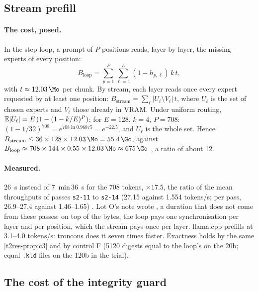 \subsection{Stream prefill}\label{t2res-sec:flux}

\paragraph{The cost, posed.} In the step loop, a prompt of $P$ positions reads, layer by layer, the missing experts of every position:
\[
B_{\text{loop}} = \sum_{p=1}^{P}\sum_{\ell=1}^{L} (1 - h_{p,\ell}) \, k \, t,
\]
with $t \approx \SI{12.03}{\Mo}$ per chunk. By stream, each layer reads once every expert requested by at least one position: $B_{\text{stream}} = \sum_\ell |U_\ell \setminus V_\ell| \, t$, where $U_\ell$ is the set of chosen experts and $V_\ell$ those already in VRAM. Under uniform routing, $\mathbb{E}|U_\ell| = E\,(1 - (1 - k/E)^P)$; for $E = 128$, $k = 4$, $P = 708$: $(1 - 1/32)^{708} = e^{708 \ln 0.96875} = e^{-22.5}$, and $U_\ell$ is the whole set. Hence $B_{\text{stream}} \le 36 \times 128 \times \SI{12.03}{\Mo} = \SI{55.4}{\Go}$, against $B_{\text{loop}} \approx 708 \times 144 \times 0.55 \times \SI{12.03}{\Mo} \approx \SI{675}{\Go}$ \calc, a ratio of about 12.

\paragraph{Measured.} \SI{26}{\second} instead of \SI{7}{\minute}\,\SI{36}{\second} for the 708 tokens, $\times 17.5$, the ratio of the mean throughputs of passes \texttt{s2-11} to \texttt{s2-14} (\num{27.15} against \num{1.554} tokens/s; per pass, \numrange{26.9}{27.4} against \numrange{1.46}{1.65}) \mes. Lot O's note wrote , a duration that does not come from these passes: on top of the bytes, the loop pays one synchronisation per layer and per position, which the stream pays once per layer. llama.cpp prefills at \numrange{3.1}{4.0} tokens/s: troncons does it seven times faster. Exactness holds by the same \cref{t2res-prop:c3} and by control F (\num{5120} digests equal to the loop's on the 20b; equal \texttt{.kld} files on the 120b in the trial).

\subsection{The cost of the integrity guard}\label{t2res-sec:garde}

